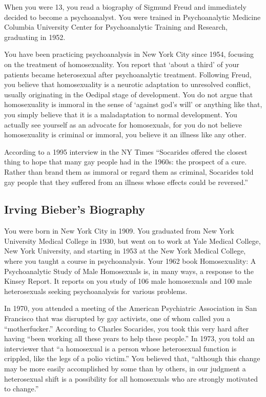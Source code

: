 \begin{refsection}
When you were 13, you read a biography of Sigmund Freud and immediately decided to become a psychoanalyst. You were trained in Psychoanalytic Medicine Columbia University Center for Psychoanalytic Training and Research, graduating in 1952.

You have been practicing psychoanalysis in New York City since 1954, focusing on the treatment of homosexuality. You report that `about a third' of your patients became heterosexual after psychoanalytic treatment. Following Freud, you believe that homosexuality is a neurotic adaptation to unresolved conflict, usually originating in the Oedipal stage of development. You do not argue that homosexuality is immoral in the sense of `against god's will' or anything like that, you simply believe that it is a maladaptation to normal development. You actually see yourself as an advocate for homosexuals, for you do not believe homosexuality is criminal or immoral, you believe it an illness like any other.

According to a 1995 interview in the NY Times ``Socarides offered the closest thing to hope that many gay people had in the 1960s: the prospect of a cure. Rather than brand them as immoral or regard them as criminal, Socarides told gay people that they suffered from an illness whose effects could be reversed.''

\subsection{Irving Bieber's Biography}
\label{irvingbiebersbiography}

You were born in New York City in 1909. You graduated from New York University Medical College in 1930, but went on to work at Yale Medical College, New York University, and starting in 1953 at the New York Medical College, where you taught a course in psychoanalysis. Your 1962 book Homosexuality: A Psychoanalytic Study of Male Homosexuals is, in many ways, a response to the Kinsey Report. It reports on you study of 106 male homosexuals and 100 male heterosexuals seeking psychoanalysis for various problems.

In 1970, you attended a meeting of the American Psychiatric Association in San Francisco that was disrupted by gay activists, one of whom called you a ``motherfucker.'' According to Charles Socarides, you took this very hard after having ``been working all these years to help these people.'' In 1973, you told an interviewer that ``a homosexual is a person whose heterosexual function is crippled, like the legs of a polio victim.'' You believed that, ``although this change may be more easily accomplished by some than by others, in our judgment a heterosexual shift is a possibility for all homosexuals who are strongly motivated to change.''


\end{refsection}
